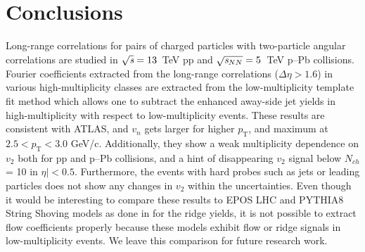 
\section{Conclusions}
\label{sec:summary}
Long-range correlations for pairs of charged particles with two-particle angular correlations are studied in ${\sqrt{{\textit s}}}=13$~TeV pp and ${\sqrt{{\textit s_{NN}}}}=5$~TeV p--Pb collisions. Fourier coefficients extracted from the long-range correlations ($\Delta\eta > 1.6$) in various high-multiplicity classes are extracted from the low-multiplicity template fit method which allows one to subtract the enhanced away-side jet yields in high-multiplicity with respect to low-multiplicity events.
These results are consistent with ATLAS, and $v_n$ gets larger for higher $p_\mathrm{T}$, and maximum at $2.5<p_\mathrm{T}<3.0$ GeV/c. 
Additionally, they show a weak multiplicity dependence on $v_2$ both for pp and p--Pb collisions, and a hint of disappearing $v_2$ signal below $N_{ch}$ = 10 in $\eta|<0.5$. Furthermore, the events with hard probes such as jets or leading particles does not show any changes in $v_2$ within the uncertainties. 
Even though it would be interesting to compare these results to EPOS LHC and PYTHIA8 String Shoving models as done in \cite{ALICE:2012eyl} for the ridge yields, it is not possible to extract flow coefficients properly because these models exhibit flow or ridge signals in low-multiplicity events. We leave this comparison for future research work.

